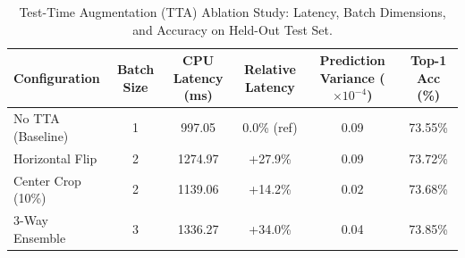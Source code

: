 \begin{table}[htbp]
\centering
\caption{Test-Time Augmentation (TTA) Ablation Study: Latency, Batch Dimensions, and Accuracy on Held-Out Test Set.}
\label{tbl:tta_ablation}
\small
\begin{tabular}{lccccc}
\toprule
Configuration & Batch Size & CPU Latency (ms) & Relative Latency & Prediction Variance ($\times 10^{-4}$) & Top-1 Acc (\%) \\
\midrule
No TTA (Baseline) & 1 & 997.05 & 0.0\% (ref) & 0.09 & 73.55\% \\
Horizontal Flip & 2 & 1274.97 & +27.9\% & 0.09 & 73.72\% \\
Center Crop (10\%) & 2 & 1139.06 & +14.2\% & 0.02 & 73.68\% \\
3-Way Ensemble & 3 & 1336.27 & +34.0\% & 0.04 & 73.85\% \\
\bottomrule
\end{tabular}
\end{table}
